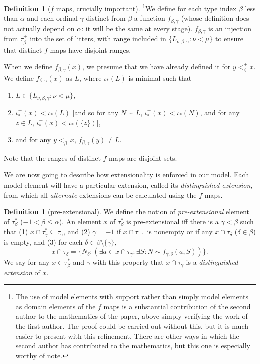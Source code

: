 \documentclass{article}
\theoremstyle{definition}
\newtheorem{definition}[theorem]{Definition}
\theoremstyle{remark}
\begin{document}
\begin{definition}[$f$ maps, crucially important]\footnote{The use of model elements with support rather than simply model elements as domain elements of the $f$ maps is a substantial contribution of the second author to the mathematics of the paper, above simply verifying the work of the first author.  The proof could be carried out without this, but it is much easier to present with this refinement.  There are other ways in which the second author has contributed to the mathematics, but this one is especially worthy of note.}\label{def:f_map}
We define for each type index $\beta$ less than $\alpha$ and each ordinal $\gamma$ distinct from $\beta$ a function $f_{\beta,\gamma}$ (whose definition does not actually depend on $\alpha$:  it will be the same at every stage).  $f_{\beta,\gamma}$ is an injection from $\tau_\beta^+$ into the set of litters, with range included in  $\{L_{\nu,\beta,\gamma}:\nu < \mu\}$ to ensure that distinct $f$ maps have disjoint ranges.




When we define $f_{\beta,\gamma}(x)$, we presume that we have already defined it for $y <^+_\beta x$.
We define $f_{\beta,\gamma}(x)$ as $L$, where $\iota_*(L)$ is minimal such that

\begin{enumerate}
\item $L \in  \{L_{\nu,\beta,\gamma}:\nu < \mu\}$,

\item  $\iota^+_*(x) <\iota_*(L)$ [and so for any $N \sim L$, $\iota^+_*(x) <\iota_*(N)$, and for any $z \in L$, $\iota^+_*(x) < \iota_*(\{z\})$],

\item and for any $y<_\beta^+ x$, $f_{\beta,\gamma}(y) \neq L$.

\end{enumerate}

\end{definition}

Note that the ranges of distinct $f$ maps are disjoint sets.


We are now going to describe how extensionality is enforced in our model.
Each model element will have a particular extension, called its {\em distinguished extension\/}, from which all {\em alternate\/} extensions can be calculated using the $f$ maps.


\begin{definition}[pre-extensional]\label{def:pre_extensional}
We define the notion of {\em pre-extensional\/} element of $\tau^*_\beta$ ($-1 <\beta \leq \alpha$).   An element $x$ of $\tau^*_\beta$ is pre-extensional iff there is a $\gamma<\beta$ such that (1) $x \cap \tau^*_\gamma \subseteq \tau_\gamma$, and (2) $\gamma=-1$ if
$x \cap \tau_{-1}$ is nonempty or if any $x \cap \tau_\delta$ ($\delta \in \beta$) is empty,  and (3) for each $\delta \in \beta \setminus \{\gamma\}$, $$x \cap \tau_\delta= \{N_\delta:(\exists a \in x\cap \tau_\gamma:\exists S:N \sim f_{\gamma,\delta}(a,S))\}.$$  We say for any $x \in \tau^*_\beta$ and $\gamma$ with this property that $x \cap \tau_\gamma$ is a {\em distinguished extension\/} of $x$.
\end{definition}
\end{document}
